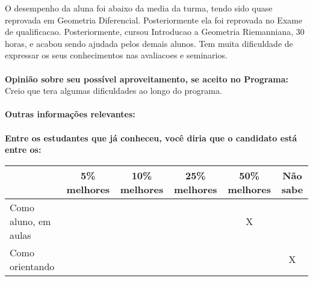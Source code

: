 \documentclass[11pt]{article}
\begin{document}
O desempenho da aluna foi abaixo da media da turma, tendo sido quase reprovada em
Geometria Diferencial. Posteriormente ela foi reprovada no  Exame de qualificacao.
Posteriormente, cursou Introducao a Geometria Riemanniana,  30 horas, e acabou sendo
ajudada pelos demais alunos. Tem muita dificuldade de expressar os seus conhecimentos 
nas avaliacoes e seminarios.\\
\\
\textbf{Opinião sobre seu possível aproveitamento, se aceito no Programa:}
\\Creio que tera algumas dificuldades ao longo do programa.\\ 
\\
\textbf{Outras informações relevantes:} \\
\\[0.3cm]
\textbf{Entre os estudantes que já conheceu, você diria que o candidato está entre os:}
\\
\begin{tabular}{|l|c|c|c|c|c|}
\hline
 & 5\% melhores & 10\% melhores & 25\% melhores & 50\% melhores & Não sabe \\
\hline
Como aluno, em aulas &  &  &  & X & \\
\hline
Como orientando &  &  &  &  & X\\
\hline
\end{tabular}
\end{document}
